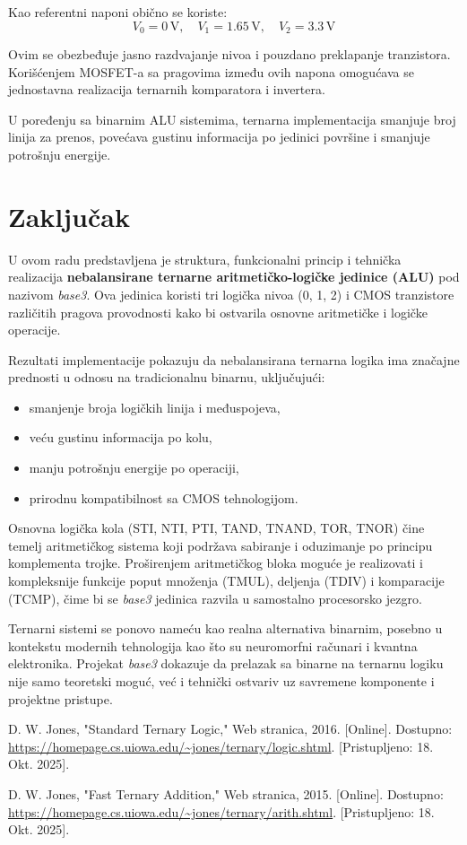 \documentclass[conference,a4paper]{IEEEtran}
\begin{document}
	Kao referentni naponi obično se koriste:
	\[
	V_0 = 0\,\text{V}, \quad V_1 = 1.65\,\text{V}, \quad V_2 = 3.3\,\text{V}
	\]
	
	Ovim se obezbeđuje jasno razdvajanje nivoa i pouzdano preklapanje tranzistora. Korišćenjem MOSFET-a sa pragovima između ovih napona omogućava se jednostavna realizacija ternarnih komparatora i invertera.
	
	U poređenju sa binarnim ALU sistemima, ternarna implementacija smanjuje broj linija za prenos, povećava gustinu informacija po jedinici površine i smanjuje potrošnju energije.
	
\section{Zaključak}

U ovom radu predstavljena je struktura, funkcionalni princip i tehnička realizacija \textbf{nebalansirane ternarne aritmetičko-logičke jedinice (ALU)} pod nazivom \textit{base3}. Ova jedinica koristi tri logička nivoa (0, 1, 2) i CMOS tranzistore različitih pragova provodnosti kako bi ostvarila osnovne aritmetičke i logičke operacije.

Rezultati implementacije pokazuju da nebalansirana ternarna logika ima značajne prednosti u odnosu na tradicionalnu binarnu, uključujući:
\begin{itemize}
	\item smanjenje broja logičkih linija i međuspojeva,
	\item veću gustinu informacija po kolu,
	\item manju potrošnju energije po operaciji,
	\item prirodnu kompatibilnost sa CMOS tehnologijom.
\end{itemize}

Osnovna logička kola (STI, NTI, PTI, TAND, TNAND, TOR, TNOR) čine temelj aritmetičkog sistema koji podržava sabiranje i oduzimanje po principu komplementa trojke. Proširenjem aritmetičkog bloka moguće je realizovati i kompleksnije funkcije poput množenja (TMUL), deljenja (TDIV) i komparacije (TCMP), čime bi se \textit{base3} jedinica razvila u samostalno procesorsko jezgro.

Ternarni sistemi se ponovo nameću kao realna alternativa binarnim, posebno u kontekstu modernih tehnologija kao što su neuromorfni računari i kvantna elektronika. Projekat \textit{base3} dokazuje da prelazak sa binarne na ternarnu logiku nije samo teoretski moguć, već i tehnički ostvariv uz savremene komponente i projektne pristupe.

	
	
	\begin{thebibliography}{1}
		
		D. W. Jones, "Standard Ternary Logic," Web stranica, 2016. [Online]. Dostupno: \url{https://homepage.cs.uiowa.edu/~jones/ternary/logic.shtml}. [Pristupljeno: 18. Okt. 2025].
		
		D. W. Jones, "Fast Ternary Addition," Web stranica, 2015. [Online]. Dostupno: \url{https://homepage.cs.uiowa.edu/~jones/ternary/arith.shtml}. [Pristupljeno: 18. Okt. 2025].
		
	\end{thebibliography}
	
\end{document}
